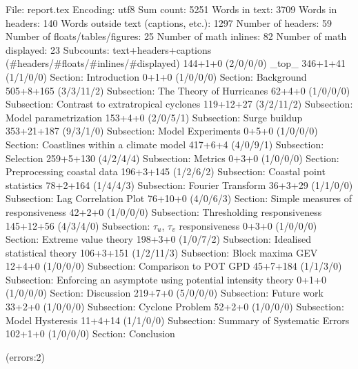 
File: report.tex
Encoding: utf8
Sum count: 5251
Words in text: 3709
Words in headers: 140
Words outside text (captions, etc.): 1297
Number of headers: 59
Number of floats/tables/figures: 25
Number of math inlines: 82
Number of math displayed: 23
Subcounts:
  text+headers+captions (#headers/#floats/#inlines/#displayed)
  144+1+0 (2/0/0/0) _top_
  346+1+41 (1/1/0/0) Section: Introduction
  0+1+0 (1/0/0/0) Section: Background
  505+8+165 (3/3/11/2) Subsection: The Theory of Hurricanes
  62+4+0 (1/0/0/0) Subsection: Contrast to extratropical cyclones
  119+12+27 (3/2/11/2) Subsection: Model parametrization
  153+4+0 (2/0/5/1) Subsection: Surge buildup
  353+21+187 (9/3/1/0) Subsection: Model Experiments
  0+5+0 (1/0/0/0) Section: Coastlines within a climate model
  417+6+4 (4/0/9/1) Subsection: Selection
  259+5+130 (4/2/4/4) Subsection: Metrics
  0+3+0 (1/0/0/0) Section: Preprocessing coastal data
  196+3+145 (1/2/6/2) Subsection: Coastal point statistics
  78+2+164 (1/4/4/3) Subsection: Fourier Transform
  36+3+29 (1/1/0/0) Subsection: Lag Correlation Plot
  76+10+0 (4/0/6/3) Section: Simple measures of responsiveness
  42+2+0 (1/0/0/0) Subsection: Thresholding responsiveness
  145+12+56 (4/3/4/0) Subsection: $\tau_u$, $\tau_v$ responsiveness
  0+3+0 (1/0/0/0) Section: Extreme value theory
  198+3+0 (1/0/7/2) Subsection: Idealised statistical theory
  106+3+151 (1/2/11/3) Subsection: Block maxima GEV
  12+4+0 (1/0/0/0) Subsection: Comparison to POT GPD
  45+7+184 (1/1/3/0) Subsection: Enforcing an asymptote using potential intensity theory 
  0+1+0 (1/0/0/0) Section: Discussion
  219+7+0 (5/0/0/0) Subsection: Future work
  33+2+0 (1/0/0/0) Subsection: Cyclone Problem
  52+2+0 (1/0/0/0) Subsection: Model Hysteresis
  11+4+14 (1/1/0/0) Subsection: Summary of Systematic Errors
  102+1+0 (1/0/0/0) Section: Conclusion

(errors:2)
